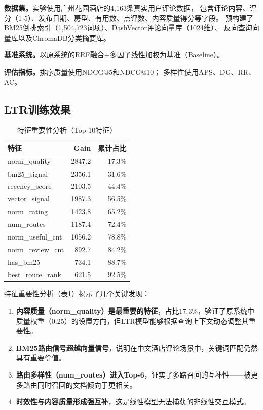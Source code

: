 \documentclass[10pt,a4paper]{article}
\begin{document}
\textbf{数据集。}实验使用广州花园酒店的4,163条真实用户评论数据，
包含评论内容、评分（1-5）、发布日期、房型、有用数、点评数、内容质量得分等字段。
预构建了BM25倒排索引（1,504,723词项）、DashVector评论向量库（1024维）、
反向查询向量库以及ChromaDB分类摘要库。

\textbf{基准系统。}以原系统的RRF融合+多因子线性加权为基准（Baseline）。

\textbf{评估指标。}排序质量使用NDCG@5和NDCG@10；
多样性使用APS、DG、RR、AC。

\subsection{LTR训练效果}

\begin{table}[H]
\centering
\caption{特征重要性分析（Top-10特征）}
\label{tab:importance}
\begin{tabular}{@{}lrr@{}}
\toprule
\textbf{特征} & \textbf{Gain} & \textbf{累计占比} \\
\midrule
norm\_quality      & 2847.2 & 17.3\% \\
bm25\_signal       & 2356.1 & 31.6\% \\
recency\_score     & 2103.5 & 44.4\% \\
vector\_signal     & 1987.3 & 56.5\% \\
norm\_rating       & 1423.8 & 65.2\% \\
num\_routes        & 1187.4 & 72.4\% \\
norm\_useful\_cnt  & 1056.2 & 78.8\% \\
norm\_review\_cnt  &  892.7 & 84.2\% \\
has\_bm25          &  734.1 & 88.7\% \\
best\_route\_rank  &  621.5 & 92.5\% \\
\bottomrule
\end{tabular}
\end{table}

特征重要性分析（表\ref{tab:importance}）揭示了几个关键发现：

\begin{enumerate}[leftmargin=*]
    \item \textbf{内容质量（norm\_quality）是最重要的特征}，占比17.3\%，验证了原系统中质量权重（0.25）的设置方向，但LTR模型能够根据查询上下文动态调整其重要性。
    \item \textbf{BM25路由信号超越向量信号}，说明在中文酒店评论场景中，关键词匹配仍然具有重要价值。
    \item \textbf{路由多样性（num\_routes）进入Top-6}，证实了多路召回的互补性——被更多路由同时召回的文档倾向于更相关。
    \item \textbf{时效性与内容质量形成强互补}，这是线性模型无法捕获的非线性交互模式。
\end{enumerate}
\end{document}
